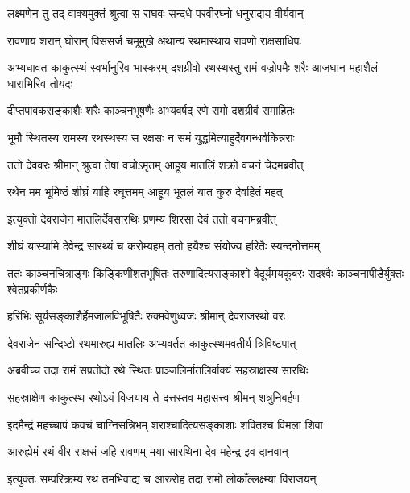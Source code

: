 
\twolineshloka
{लक्ष्मणेन तु तद् वाक्यमुक्तं श्रुत्वा स राघवः}
{सन्दधे परवीरघ्नो धनुरादाय वीर्यवान्} %

\twolineshloka
{रावणाय शरान् घोरान् विससर्ज चमूमुखे}
{अथान्यं रथमास्थाय रावणो राक्षसाधिपः} %

\threelineshloka
{अभ्यधावत काकुत्स्थं स्वर्भानुरिव भास्करम्}
{दशग्रीवो रथस्थस्तु रामं वज्रोपमैः शरैः}
{आजघान महाशैलं धाराभिरिव तोयदः} %

\twolineshloka
{दीप्तपावकसङ्काशैः शरैः काञ्चनभूषणैः}
{अभ्यवर्षद् रणे रामो दशग्रीवं समाहितः} %

\twolineshloka
{भूमौ स्थितस्य रामस्य रथस्थस्य स रक्षसः}
{न समं युद्धमित्याहुर्देवगन्धर्वकिन्नराः} %

\twolineshloka
{ततो देववरः श्रीमान् श्रुत्वा तेषां वचोऽमृतम्}
{आहूय मातलिं शक्रो वचनं चेदमब्रवीत्} %

\twolineshloka
{रथेन मम भूमिष्ठं शीघ्रं याहि रघूत्तमम्}
{आहूय भूतलं यात कुरु देवहितं महत्} %

\twolineshloka
{इत्युक्तो देवराजेन मातलिर्देवसारथिः}
{प्रणम्य शिरसा देवं ततो वचनमब्रवीत्} %

\twolineshloka
{शीघ्रं यास्यामि देवेन्द्र सारथ्यं च करोम्यहम्}
{ततो हयैश्च संयोज्य हरितैः स्यन्दनोत्तमम्} %

\threelineshloka
{ततः काञ्चनचित्राङ्गः किङ्किणीशतभूषितः}
{तरुणादित्यसङ्काशो वैदूर्यमयकूबरः}
{सदश्वैः काञ्चनापीडैर्युक्तः श्वेतप्रकीर्णकैः} %

\twolineshloka
{हरिभिः सूर्यसङ्काशैर्हेमजालविभूषितैः}
{रुक्मवेणुध्वजः श्रीमान् देवराजरथो वरः} %

\twolineshloka
{देवराजेन सन्दिष्टो रथमारुह्य मातलिः}
{अभ्यवर्तत काकुत्स्थमवतीर्य त्रिविष्टपात्} %

\twolineshloka
{अब्रवीच्च तदा रामं सप्रतोदो रथे स्थितः}
{प्राञ्जलिर्मातलिर्वाक्यं सहस्राक्षस्य सारथिः} %

\twolineshloka
{सहस्राक्षेण काकुत्स्थ रथोऽयं विजयाय ते}
{दत्तस्तव महासत्त्व श्रीमन् शत्रुनिबर्हण} %

\twolineshloka
{इदमैन्द्रं महच्चापं कवचं चाग्निसन्निभम्}
{शराश्चादित्यसङ्काशाः शक्तिश्च विमला शिवा} %

\twolineshloka
{आरुह्येमं रथं वीर राक्षसं जहि रावणम्}
{मया सारथिना देव महेन्द्र इव दानवान्} %

\twolineshloka
{इत्युक्तः सम्परिक्रम्य रथं तमभिवाद्य च}
{आरुरोह तदा रामो लोकाँल्लक्ष्म्या विराजयन्} %

